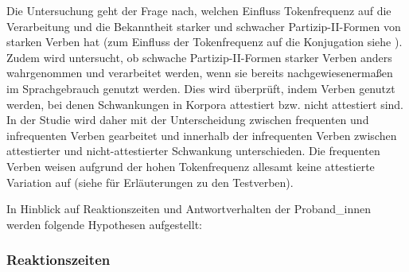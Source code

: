 Die Untersuchung geht der Frage nach, welchen Einfluss Tokenfrequenz auf die Verarbeitung und die Bekanntheit starker und schwacher Partizip-II-Formen von starken Verben hat (zum Einfluss der Tokenfrequenz auf die Konjugation siehe ). Zudem wird untersucht, ob schwache Partizip-II-Formen starker Verben anders wahrgenommen und verarbeitet werden, wenn sie bereits nachgewiesenermaßen im Sprachgebrauch genutzt werden. Dies wird überprüft, indem Verben genutzt werden, bei denen Schwankungen in Korpora attestiert bzw. nicht attestiert sind. In der Studie wird daher mit der Unterscheidung zwischen frequenten und infrequenten Verben gearbeitet und innerhalb der infrequenten Verben zwischen attestierter und nicht-attestierter Schwankung unterschieden. Die frequenten Verben weisen aufgrund der hohen Tokenfrequenz allesamt keine attestierte Variation auf (siehe  für Erläuterungen zu den Testverben). 


\begin{sloppypar}
In Hinblick auf Reaktionszeiten und Antwortverhalten der Proband\_innen werden folgende Hypothesen aufgestellt:
\end{sloppypar}

\subsubsection{Reaktionszeiten} 

